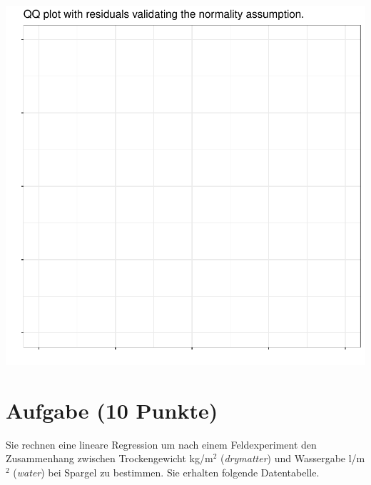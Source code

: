 \documentclass[a4paper, 10pt]{scrartcl}\usepackage[]{graphicx}\usepackage[]{color}
\makeatletter
\def\maxwidth{ %
  \ifdim\Gin@nat@width>\linewidth
    \linewidth
  \else
    \Gin@nat@width
  \fi
}
\makeatother
\begin{document}
{\centering \includegraphics[width=\maxwidth]{img/regression-04-1} 

}



 
\clearpage

\section{Aufgabe \hfill (10 Punkte)}

Sie rechnen eine lineare Regression um nach einem Feldexperiment den
Zusammenhang zwischen Trockengewicht kg/m$^2$ (\textit{drymatter}) und
Wassergabe l/m$^2$ (\textit{water}) bei Spargel zu bestimmen. Sie erhalten
folgende Datentabelle.
\end{document}
